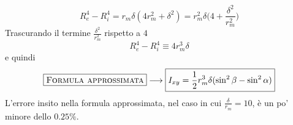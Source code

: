 \begin{equation*}
R_{e}^{4}-R_{i}^{4} = r_{m}\delta(4r_{m}^{2}+\delta^2) = r_{m}^{2}\delta\biggl(4+\frac{\delta^2}{r_{m}^{2}}\biggr)
\end{equation*}
Trascurando il termine $\frac{\delta^2}{r_{m}^{2}}$ rispetto a $4$
\begin{equation*}
R_{e}^{4}-R_{i}^{4} \equiv 4r_{m}^{3}\delta 
\end{equation*}
e quindi
\begin{equation*}
\boxed{\textup{\textsc{Formula approssimata}}} \longrightarrow \boxed{I_{xy} = \frac{1}{2}r_{m}^{3}\delta(\sin^{2}\beta-\sin^{2}\alpha)}
\end{equation*}
L'errore insito nella formula approssimata, nel caso in cui $\frac{\delta}{r_{m}}=10$, è un po' minore dello $0.25\%$.
